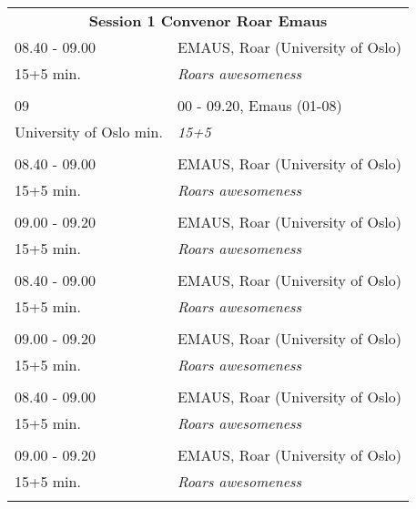 \begin{table}[h!]
\begin{tabular}{p{3cm}p{13cm}}
\multicolumn{2}{c}{{\bf Session 1  \hfill Convenor Roar Emaus}}\\ 
 08.40 - 09.00 & EMAUS, Roar (University of Oslo)\\ 
15+5 min. & {\it Roars awesomeness}\\ 
 & \\ 09 & 00 - 09.20, Emaus (01-08)\\ 
University of Oslo min. & {\it 15+5}\\ 
 & \\ 08.40 - 09.00 & EMAUS, Roar (University of Oslo)\\ 
15+5 min. & {\it Roars awesomeness}\\ 
 & \\ 09.00 - 09.20 & EMAUS, Roar (University of Oslo)\\ 
15+5 min. & {\it Roars awesomeness}\\ 
 & \\ 08.40 - 09.00 & EMAUS, Roar (University of Oslo)\\ 
15+5 min. & {\it Roars awesomeness}\\ 
 & \\ 09.00 - 09.20 & EMAUS, Roar (University of Oslo)\\ 
15+5 min. & {\it Roars awesomeness}\\ 
 & \\ 08.40 - 09.00 & EMAUS, Roar (University of Oslo)\\ 
15+5 min. & {\it Roars awesomeness}\\ 
 & \\ 09.00 - 09.20 & EMAUS, Roar (University of Oslo)\\ 
15+5 min. & {\it Roars awesomeness}\\ 
 & \\ \end{tabular}
\end{table}

\hspace*{-10cm}

